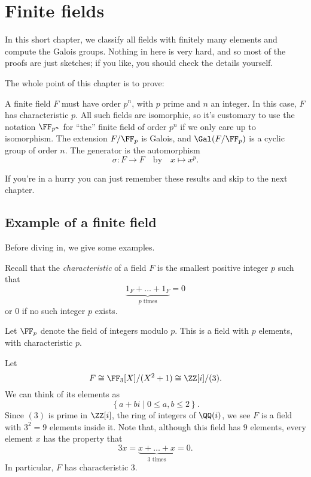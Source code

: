 \chapter{Finite fields}
In this short chapter, we classify all fields with finitely many elements
and compute the Galois groups.
Nothing in here is very hard, and so most of the proofs are just sketches;
if you like, you should check the details yourself.

The whole point of this chapter is to prove:
\begin{itemize}
	\ii A finite field $F$ must have order $p^n$, with $p$ prime and $n$ an integer.
	\ii In this case, $F$ has characteristic $p$.
	\ii All such fields are isomorphic,
	so it's customary to use the notation $\FF_{p^n}$
	for ``the'' finite field of order $p^n$ if we only care up to isomorphism.
	\ii The extension $F/\FF_p$ is Galois, and $\Gal(F/\FF_p)$ is a cyclic group of order $n$.
	The generator is the automorphism \[ \sigma : F \to F \quad\text{by}\quad x \mapsto x^p. \]
\end{itemize}
If you're in a hurry you can just remember these results and skip to the next chapter.

\section{Example of a finite field}
Before diving in, we give some examples.

Recall that the \emph{characteristic} of a field $F$
is the smallest positive integer $p$ such that
\[ \underbrace{1_F + \dots + 1_F}_{\text{$p$ times}} = 0 \]
or $0$ if no such integer $p$ exists.

\begin{example}
	Let $\FF_p$ denote the field of integers modulo $p$.
	This is a field with $p$ elements, with characteristic $p$.
\end{example}

\begin{example}
	Let
	\[ F \cong \FF_3[X]/(X^2+1) \cong \ZZ[i] / (3). \]
	We can think of its elements as \[ \left\{ a + bi \mid 0 \le a,b \le 2 \right\}. \]
	Since $(3)$ is prime in $\ZZ[i]$, the ring of integers of $\QQ(i)$,
	we see $F$ is a field with $3^2 = 9$ elements inside it.
	Note that, although this field has $9$ elements, every element $x$ has the property that
	\[ 3x = \underbrace{x + \dots + x}_{\text{$3$ times}} = 0. \]
	In particular, $F$ has characteristic $3$.
\end{example}

